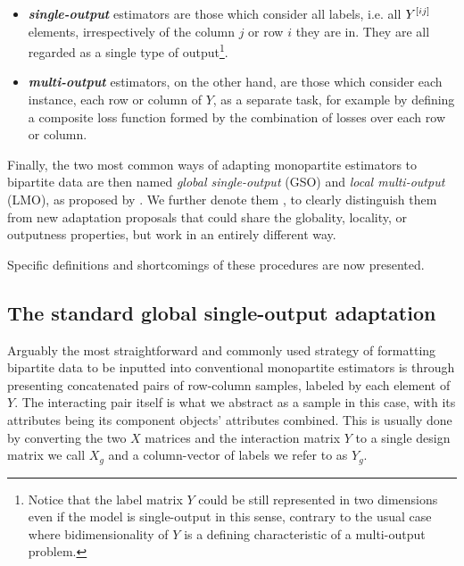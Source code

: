 \begin{itemize}
    \item \emph{\textbf{single-output}} estimators are those which consider all labels, i.e. all $Y^{[ij]}$ elements, irrespectively of the column $j$ or row $i$ they are in. They are all regarded as a single type of output\footnote{Notice that the label matrix $Y$ could be still represented in two dimensions even if the model is single-output in this sense, contrary to the usual case where bidimensionality of $Y$ is a defining characteristic of a multi-output problem.}.
    \item \emph{\textbf{multi-output}} estimators, on the other hand, are those which consider each instance, each row or column of $Y$, as a separate task, for example by defining a composite loss function formed by the combination of losses over each row or column.
\end{itemize}

Finally, the two most common ways of adapting monopartite estimators to bipartite data are then named \emph{global single-output} (GSO) and \emph{local multi-output} (LMO), as proposed by \citet{pliakos2018,pliakos2019,pliakos2020}. We further denote them , to clearly distinguish them from new adaptation proposals that could share the globality, locality, or outputness properties, but work in an entirely different way.

Specific definitions and shortcomings of these procedures are now presented.


\subsection{The standard global single-output adaptation}
\label{sec:sgso}
Arguably the most straightforward and commonly used strategy of formatting bipartite data to be inputted into conventional monopartite estimators is through presenting concatenated pairs of row-column samples, labeled by each element of $Y$.
%
The interacting pair itself is what we abstract as a sample
in this case, with its attributes being its component objects' attributes
combined. This is usually done by converting the two $X$ matrices and the
interaction matrix $Y$ to a single design matrix we call $X_g$ and a column-vector
 of labels we refer to as $Y_g$.

